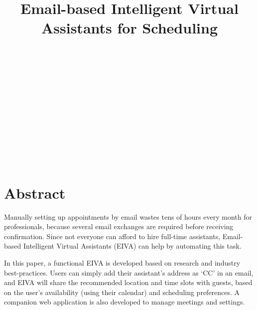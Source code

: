 \documentclass{article}
\title{{\titlefont \linespread{1.5} Email-based Intelligent Virtual Assistants for Scheduling}}
\begin{document}

\vspace*{\fill}
\begin{center}
	\\
	\vspace{3mm}
	\\
	\vspace{30mm}
	\\
	\vspace{3mm}
	\\
	\vspace{30mm}
	\\
	\vspace{3mm}
	\\
	\vspace{30mm}
	\\
	\vspace{3mm}
	\coverfont{\today}\\
	\vspace{30mm}
	\\
	\vspace{3mm}
	\\
\end{center}
\vspace*{\fill}

\newpage


\section*{Abstract}

Manually setting up appointments by email wastes tens of hours every month for professionals, because several email exchanges are required before receiving confirmation. Since not everyone can afford to hire full-time assistants, Email-based Intelligent Virtual Assistants (EIVA) can help by automating this task.

In this paper, a functional EIVA is developed based on research and industry best-practices. Users can simply add their assistant's address as `CC' in an email, and EIVA will share the recommended location and time slots with guests, based on the user's availability (using their calendar) and scheduling preferences. A companion web application is also developed to manage meetings and settings.
\end{document}
